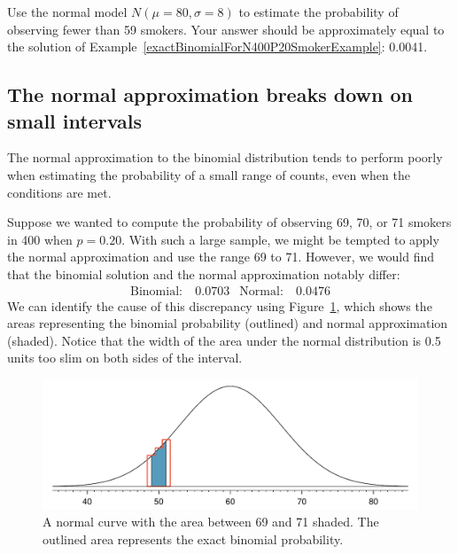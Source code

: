 \begin{exercisewrap}
\begin{nexercise}
Use the normal model $N(\mu=80, \sigma=8)$ to estimate the probability of observing fewer than 59 smokers. Your answer should be approximately equal to the solution of Example~\ref{exactBinomialForN400P20SmokerExample}: 0.0041.\footnotemark
\end{nexercise}
\end{exercisewrap}


\subsection{The normal approximation breaks down on small intervals}

The normal approximation to the binomial distribution tends to perform poorly when estimating the probability of a small range of counts, even when the conditions are met.

Suppose we wanted to compute the probability of observing 69, 70, or 71 smokers in 400 when $p=0.20$. With such a large sample, we might be tempted to apply the normal approximation and use the range 69 to 71. However, we would find that the binomial solution and the normal approximation notably differ:
\begin{align*}
\text{Binomial:}&\ 0.0703
&\text{Normal:}&\ 0.0476
\end{align*}
We can identify the cause of this discrepancy using Figure~\ref{normApproxToBinomFail}, which shows the areas representing the binomial probability (outlined) and normal approximation (shaded). Notice that the width of the area under the normal distribution is 0.5 units too slim on both sides of the interval.

\begin{figure}[h]
\centering
\includegraphics[width=\textwidth]{ch_distributions/figures/normApproxToBinomFail/normApproxToBinomFail}
\caption{A normal curve with the area between 69 and 71 shaded. The outlined area represents the exact binomial probability.}
\label{normApproxToBinomFail}
\end{figure}


